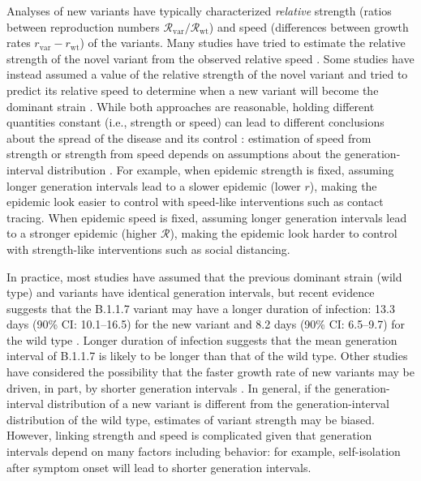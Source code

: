 \documentclass[12pt]{article}
\newcommand{\vvvar}{\mathrm{var}}
\newcommand{\wwwt}{\mathrm{wt}}
\newcommand{\rx}[1]{\ensuremath{{r}_{#1}}\xspace}
\newcommand{\rw}{\rx{\wwwt}}
\newcommand{\rv}{\rx{\vvvar}}
\newcommand{\Rx}[1]{\ensuremath{{\mathcal R}_{#1}}\xspace}
\newcommand{\RR}{\ensuremath{{\mathcal R}}\xspace}
\newcommand{\Rw}{\Rx{\wwwt}}
\newcommand{\Rv}{\Rx{\vvvar}}
\begin{document}
Analyses of new variants have typically characterized \emph{relative} strength (ratios between reproduction numbers $\Rv/\Rw$) and speed (differences between growth rates $\rv-\rw$) of the variants.
Many studies have tried to estimate the relative strength of the novel variant from the observed relative speed \citep{davies2021estimated, leung2021early, volz2021transmission,zhao2021}.
Some studies have instead assumed a value of the relative strength of the novel variant and tried to predict its relative speed to determine when a new variant will become the dominant strain \citep{davies2021estimated,di2021impact}.
While both approaches are reasonable, holding different quantities constant (i.e., strength or speed) can lead to different conclusions about the spread of the disease and its control \citep{doi:10.1098/rspb.2020.1556}:
estimation of speed from strength or strength from speed depends on assumptions about the generation-interval distribution \citep{roberts2007model,svensson2007note,wallinga2007generation}.
For example, when epidemic strength is fixed, assuming longer generation intervals lead to a slower epidemic (lower $r$), making the epidemic look easier to control with speed-like interventions such as contact tracing.
When epidemic speed is fixed, assuming longer generation intervals lead to a stronger epidemic (higher $\RR$), making the epidemic look harder to control with strength-like interventions such as social distancing.

In practice, most studies have assumed that the previous dominant strain (wild type) and variants have identical generation intervals, but recent evidence suggests that the B.1.1.7 variant may have a longer duration of infection: 13.3 days (90\% CI: 10.1--16.5) for the new variant and 8.2 days (90\% CI: 6.5--9.7) for the wild type \citep{kissler2021densely}.
Longer duration of infection suggests that the mean generation interval of B.1.1.7 is likely to be longer than that of the wild type.
Other studies have considered the possibility that the faster growth rate of new variants may be driven, in part, by shorter generation intervals \citep{davies2021estimated,volz2021transmission}.
In general, if the generation-interval distribution of a new variant is different from the generation-interval distribution of the wild type, estimates of variant strength may be biased.
However, linking strength and speed is complicated given that generation intervals depend on many factors including behavior:
for example, self-isolation after symptom onset will lead to shorter generation intervals.
\end{document}
